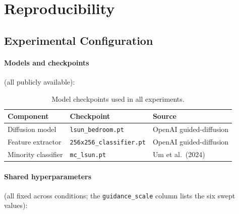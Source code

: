 \documentclass[10pt]{article}
\begin{document}



\appendix
\section{Reproducibility}
\label{sec:reproducibility}

\subsection{Experimental Configuration}
\label{sec:config}

\paragraph{Models and checkpoints} (all publicly available):

\begin{table}[h]
\centering
\caption{Model checkpoints used in all experiments.}
\renewcommand{\arraystretch}{1.1}
\begin{tabular}{@{}lll@{}}
\toprule
\textbf{Component} & \textbf{Checkpoint} & \textbf{Source} \\
\midrule
Diffusion model     & \texttt{lsun\_bedroom.pt}     & OpenAI guided-diffusion \\
Feature extractor   & \texttt{256x256\_classifier.pt} & OpenAI guided-diffusion \\
Minority classifier & \texttt{mc\_lsun.pt}          & Um et al.\ (2024) \\
\bottomrule
\end{tabular}
\end{table}

\paragraph{Shared hyperparameters} (all fixed across conditions; the
\texttt{guidance\_scale} column lists the six swept values):
\end{document}
